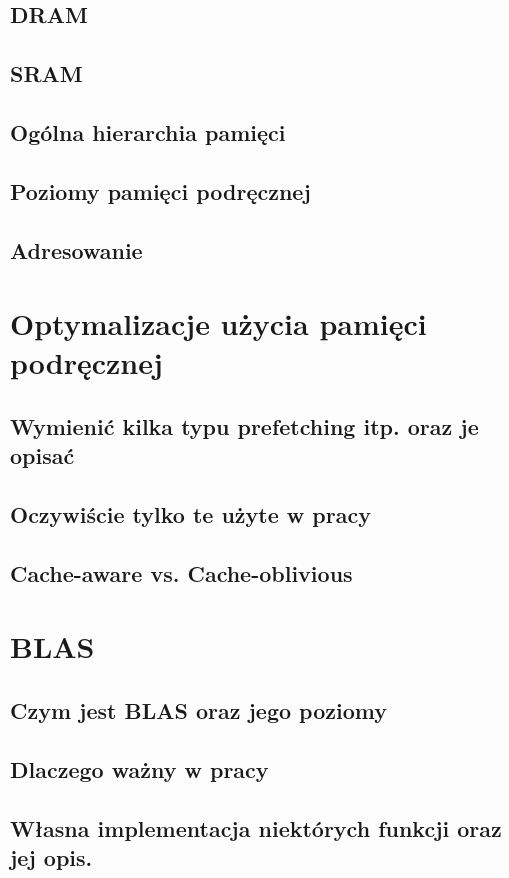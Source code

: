 \documentclass[a4paper,12pt]{book} %
\begin{document}
\section{DRAM}
\section{SRAM}
\section{Ogólna hierarchia pamięci}
\section{Poziomy pamięci podręcznej}
\section{Adresowanie}

\chapter{Optymalizacje użycia pamięci podręcznej}
\section{Wymienić kilka typu prefetching itp. oraz je opisać}
\section{Oczywiście tylko te użyte w pracy}
\section{Cache-aware vs. Cache-oblivious}

\chapter{BLAS}
\section{Czym jest BLAS oraz jego poziomy}
\section{Dlaczego ważny w pracy}
\section{Własna implementacja niektórych funkcji oraz jej opis.}
\end{document}
